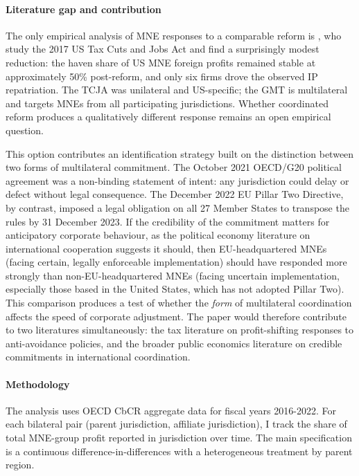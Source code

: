 \documentclass[11pt,a4paper]{article}
\begin{document}
\paragraph{Literature gap and contribution} The only empirical analysis of MNE responses to a comparable reform is \citet{garcia2022}, who study the 2017 US Tax Cuts and Jobs Act and find a surprisingly modest reduction: the haven share of US MNE foreign profits remained stable at approximately 50\% post-reform, and only six firms drove the observed IP repatriation. The TCJA was unilateral and US-specific; the GMT is multilateral and targets MNEs from all participating jurisdictions. Whether coordinated reform produces a qualitatively different response remains an open empirical question.

This option contributes an identification strategy built on the distinction between two forms of multilateral commitment. The October 2021 OECD/G20 political agreement was a non-binding statement of intent: any jurisdiction could delay or defect without legal consequence. The December 2022 EU Pillar Two Directive, by contrast, imposed a legal obligation on all 27 Member States to transpose the rules by 31 December 2023. If the credibility of the commitment matters for anticipatory corporate behaviour, as the political economy literature on international cooperation suggests it should, then EU-headquartered MNEs (facing certain, legally enforceable implementation) should have responded more strongly than non-EU-headquartered MNEs (facing uncertain implementation, especially those based in the United States, which has not adopted Pillar Two). This comparison produces a test of whether the \textit{form} of multilateral coordination affects the speed of corporate adjustment. The paper would therefore contribute to two literatures simultaneously: the tax literature on profit-shifting responses to anti-avoidance policies, and the broader public economics literature on credible commitments in international coordination.

\paragraph{Methodology} The analysis uses OECD CbCR aggregate data for fiscal years 2016-2022. For each bilateral pair (parent jurisdiction, affiliate jurisdiction), I track the share of total MNE-group profit reported in jurisdiction over time. The main specification is a continuous difference-in-differences with a heterogeneous treatment by parent region.
\end{document}
